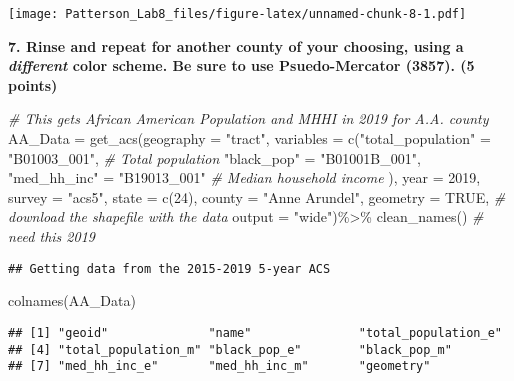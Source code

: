 \documentclass[
]{article}
\newenvironment{Shaded}{\begin{snugshade}}{\end{snugshade}}
\newcommand{\AttributeTok}[1]{\textcolor[rgb]{0.77,0.63,0.00}{#1}}
\newcommand{\CommentTok}[1]{\textcolor[rgb]{0.56,0.35,0.01}{\textit{#1}}}
\newcommand{\ConstantTok}[1]{\textcolor[rgb]{0.00,0.00,0.00}{#1}}
\newcommand{\DecValTok}[1]{\textcolor[rgb]{0.00,0.00,0.81}{#1}}
\newcommand{\FunctionTok}[1]{\textcolor[rgb]{0.00,0.00,0.00}{#1}}
\newcommand{\NormalTok}[1]{#1}
\newcommand{\OtherTok}[1]{\textcolor[rgb]{0.56,0.35,0.01}{#1}}
\newcommand{\SpecialCharTok}[1]{\textcolor[rgb]{0.00,0.00,0.00}{#1}}
\newcommand{\StringTok}[1]{\textcolor[rgb]{0.31,0.60,0.02}{#1}}
\begin{document}
\texttt{[image: Patterson\_Lab8\_files/figure-latex/unnamed-chunk-8-1.pdf]}

\textbf{7. Rinse and repeat for another county of your choosing, using a
\emph{different} color scheme. Be sure to use Psuedo-Mercator (3857). (5
points)}

\begin{Shaded}
\begin{Highlighting}[]
\CommentTok{\# This gets African American Population and MHHI in 2019 for A.A. county}
\NormalTok{AA\_Data }\OtherTok{=}  \FunctionTok{get\_acs}\NormalTok{(}\AttributeTok{geography =} \StringTok{"tract"}\NormalTok{, }
     \AttributeTok{variables =} \FunctionTok{c}\NormalTok{(}\StringTok{"total\_population"} \OtherTok{=} \StringTok{"B01003\_001"}\NormalTok{, }\CommentTok{\# Total population}
                   \StringTok{"black\_pop"} \OtherTok{=} \StringTok{"B01001B\_001"}\NormalTok{,}
                   \StringTok{"med\_hh\_inc"} \OtherTok{=} \StringTok{"B19013\_001"} \CommentTok{\# Median household income}
\NormalTok{                   ), }
     \AttributeTok{year =} \DecValTok{2019}\NormalTok{,}
     \AttributeTok{survey =} \StringTok{"acs5"}\NormalTok{,}
     \AttributeTok{state =} \FunctionTok{c}\NormalTok{(}\DecValTok{24}\NormalTok{), }
     \AttributeTok{county =} \StringTok{"Anne Arundel"}\NormalTok{,}
     \AttributeTok{geometry =} \ConstantTok{TRUE}\NormalTok{, }\CommentTok{\# download the shapefile with the data}
     \AttributeTok{output =} \StringTok{"wide"}\NormalTok{)}\SpecialCharTok{\%\textgreater{}\%} \FunctionTok{clean\_names}\NormalTok{() }\CommentTok{\# need this 2019}
\end{Highlighting}
\end{Shaded}

\begin{verbatim}
## Getting data from the 2015-2019 5-year ACS
\end{verbatim}

\begin{Shaded}
\begin{Highlighting}[]
\FunctionTok{colnames}\NormalTok{(AA\_Data)}
\end{Highlighting}
\end{Shaded}

\begin{verbatim}
## [1] "geoid"              "name"               "total_population_e"
## [4] "total_population_m" "black_pop_e"        "black_pop_m"       
## [7] "med_hh_inc_e"       "med_hh_inc_m"       "geometry"
\end{verbatim}
\end{document}
